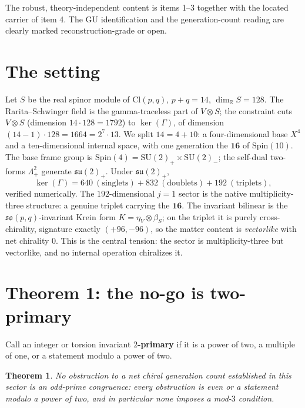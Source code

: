 \documentclass[11pt]{article}
\newtheorem{theorem}{Theorem}
\theoremstyle{definition}
\theoremstyle{remark}
\newcommand{\R}{\mathbb{R}}
\newcommand{\Cl}{\mathrm{Cl}}
\newcommand{\Spin}{\mathrm{Spin}}
\newcommand{\SU}{\mathrm{SU}}
\newcommand{\Lamp}{\Lambda^2_{+}}
\begin{document}
The robust, theory-independent content is items 1--3 together with the located carrier of item 4. The GU
identification and the generation-count reading are clearly marked reconstruction-grade or open.

\section{The setting}\label{sec:setting}

Let $S$ be the real spinor module of $\Cl(p,q)$, $p+q=14$, $\dim_\R S = 128$. The Rarita--Schwinger field is the
gamma-traceless part of $V\otimes S$; the constraint cuts $V\otimes S$ (dimension $14\cdot128=1792$) to
$\ker(\Gamma)$, of dimension $(14-1)\cdot128 = 1664 = 2^7\cdot 13$. We split $14 = 4+10$: a four-dimensional base
$X^4$ and a ten-dimensional internal space, with one generation the $\mathbf{16}$ of $\Spin(10)$. The base frame
group is $\Spin(4)=\SU(2)_+\times\SU(2)_-$; the self-dual two-forms $\Lamp$ generate $\mathfrak{su}(2)_+$. Under
$\mathfrak{su}(2)_+$,
\[
\ker(\Gamma) = 640~(\text{singlets}) + 832~(\text{doublets}) + 192~(\text{triplets}),
\]
verified numerically. The $192$-dimensional $j=1$ sector is the native multiplicity-three structure: a genuine
triplet carrying the $\mathbf{16}$. The invariant bilinear is the $\mathfrak{so}(p,q)$-invariant Krein form
$K = \eta_V\otimes\beta_S$; on the triplet it is purely cross-chirality, signature exactly $(+96,-96)$, so the
matter content is \emph{vectorlike} with net chirality $0$. This is the central tension: the sector is
multiplicity-three but vectorlike, and no internal operation chiralizes it.

\section{Theorem 1: the no-go is two-primary}\label{sec:thm1}

Call an integer or torsion invariant \textbf{$2$-primary} if it is a power of two, a multiple of one, or a
statement modulo a power of two.

\begin{theorem}\label{thm:1}
No obstruction to a net chiral generation count established in this sector is an odd-prime congruence: every
obstruction is even or a statement modulo a power of two, and in particular none imposes a mod-$3$ condition.
\end{theorem}
\end{document}

